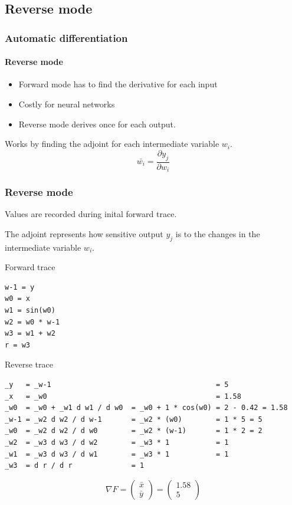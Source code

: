 \documentclass{beamer}
\begin{document}
\subsection{Reverse mode}

\begin{frame}
    \frametitle{Automatic differentiation}
    \framesubtitle{Reverse mode}
    
    \begin{itemize}
        \item Forward mode has to find the derivative for each input
        \item Costly for neural networks
        \item Reverse mode derives once for each output.
    \end{itemize}

    \pause

    Works by finding the adjoint for each intermediate variable $w_i$.
    $$\bar{w_i} = \frac{\partial y_j}{\partial w_i}$$

\end{frame}

\begin{frame}[fragile]
    \frametitle{Reverse mode}
    
    Values are recorded during inital forward trace.

    The adjoint represents how sensitive output $y_j$ is to the changes in the intermediate variable $w_i$.

    \pause

    Forward trace
    \begin{lstlisting}[basicstyle=\tiny]
w-1 = y
w0 = x
w1 = sin(w0)
w2 = w0 * w-1
w3 = w1 + w2
r = w3
    \end{lstlisting}

    Reverse trace
    \begin{lstlisting}[basicstyle=\tiny, label={lst:autodiff_rev_trace}]
_y   = _w-1                                       = 5
_x   = _w0                                        = 1.58
_w0  = _w0 + _w1 d w1 / d w0  = _w0 + 1 * cos(w0) = 2 - 0.42 = 1.58
_w-1 = _w2 d w2 / d w-1       = _w2 * (w0)        = 1 * 5 = 5
_w0  = _w2 d w2 / d w0        = _w2 * (w-1)       = 1 * 2 = 2
_w2  = _w3 d w3 / d w2        = _w3 * 1           = 1
_w1  = _w3 d w3 / d w1        = _w3 * 1           = 1
_w3  = d r / d r              = 1
    \end{lstlisting}
    \pause

    $$\nabla F = \left( \begin{array}{c}
        \bar{x}\\
        \bar{y}
    \end{array} \right) = \left( \begin{array}{c}
        1.58\\
        5
    \end{array} \right)$$
\end{frame}
\end{document}
